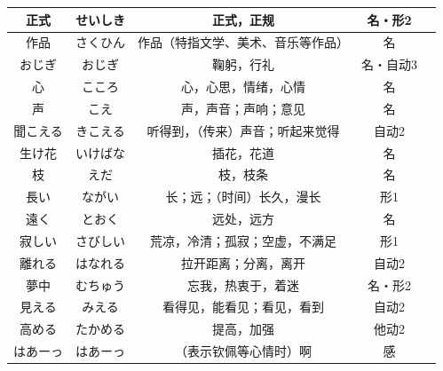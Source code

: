 \begin{longtable}{|c|c|c|c|c|}
    正式 & せいしき & 正式，正规 & 名・形2 & \\ \hline
    作品 & さくひん & 作品（特指文学、美术、音乐等作品） & 名 & \\ \hline
    おじぎ & おじぎ & 鞠躬，行礼 & 名・自动3 & \\ \hline
    心 & こころ & 心，心思，情绪，心情 & 名 & \\ \hline
    声 & こえ & 声，声音；声响；意见 & 名 & \\ \hline
    聞こえる & きこえる & 听得到，（传来）声音；听起来觉得 & 自动2 & \\ \hline
    生け花 & いけばな & 插花，花道 & 名 & \\ \hline
    枝 & えだ & 枝，枝条 & 名 & \\ \hline
    長い & ながい & 长；远；（时间）长久，漫长 & 形1 & \\ \hline
    遠く & とおく & 远处，远方 & 名 & \\ \hline
    寂しい & さびしい & 荒凉，冷清；孤寂；空虚，不满足 & 形1 & \\ \hline
    離れる & はなれる & 拉开距离；分离，离开 & 自动2 & \\ \hline
    夢中 & むちゅう & 忘我，热衷于，着迷 & 名・形2 & \\ \hline
    見える & みえる & 看得见，能看见；看见，看到 & 自动2 & \\ \hline
    高める & たかめる & 提高，加强 & 他动2 & \\ \hline
    はあーっ & はあーっ & （表示钦佩等心情时）啊 & 感 & \\ \hline
\end{longtable}

